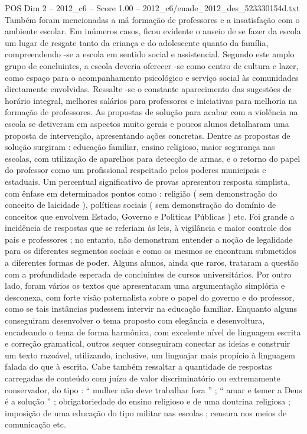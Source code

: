 \begin{textsample}{POS Dim 2 – 2012\_c6 – Score 1.00 – 2012\_c6/enade\_2012\_des\_523330154d.txt}
Também foram mencionadas a má formação de professores e a insatisfação com o ambiente escolar.
Em inúmeros casos, ficou evidente o anseio de se fazer da escola um lugar de resgate tanto da criança e do adolescente quanto da família, compreendendo -se a escola em sentido social e assistencial.
Segundo este amplo grupo de concluintes, a escola deveria oferecer -se como centro de cultura e lazer, como espaço para o acompanhamento psicológico e serviço social às comunidades diretamente envolvidas.
Ressalte -se o constante aparecimento das sugestões de horário integral, melhores salários para professores e iniciativas para melhoria na formação de professores.
As propostas de solução para acabar com a violência na escola se detiveram em aspectos muito gerais e poucos alunos detalharam uma proposta de intervenção, apresentando ações concretas.
Dentre as propostas de solução surgiram : educação familiar, ensino religioso, maior segurança nas escolas, com utilização de aparelhos para detecção de armas, e o retorno do papel do professor como um profissional respeitado pelos poderes municipais e estaduais.
Um percentual significativo de provas apresentou resposta simplista, com ênfase em determinados pontos como : religião ( sem demonstração do conceito de laicidade ), políticas sociais ( sem demonstração do domínio de conceitos que envolvem Estado, Governo e Politicas Públicas ) etc.
Foi grande a incidência de respostas que se referiam às leis, à vigilância e maior controle dos pais e professores ; no entanto, não demonstram entender a noção de legalidade para os diferentes segmentos sociais e como os mesmos se encontram submetidos a diferentes formas de poder.
Alguns alunos, ainda que raros, trataram a questão com a profundidade esperada de concluintes de cursos universitários.
Por outro lado, foram vários os textos que apresentaram uma argumentação simplória e desconexa, com forte visão paternalista sobre o papel do governo e do professor, como se tais instâncias pudessem intervir na educação familiar.
Enquanto alguns conseguiram desenvolver o tema proposto com elegância e desenvoltura, encadeando o tema de forma harmônica, com excelente nível de linguagem escrita e correção gramatical, outros sequer conseguiram conectar as ideias e construir um texto razoável, utilizando, inclusive, um linguajar mais propício à linguagem falada do que à escrita.
Cabe também ressaltar a quantidade de respostas carregadas de conteúdo com juízo de valor discriminatório ou extremamente conservador, do tipo : “ mulher não deve trabalhar fora ” ; “ amar e temer a Deus é a solução ” ; obrigatoriedade do ensino religioso e de uma doutrina religiosa ; imposição de uma educação do tipo militar nas escolas ; censura nos meios de comunicação etc.

\end{textsample}
